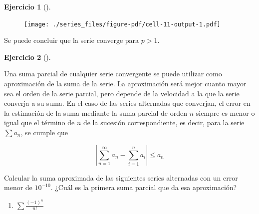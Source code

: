 \documentclass[
  a4paper,
]{scrreport}
\providecommand{\tightlist}{%
  \setlength{\itemsep}{0pt}\setlength{\parskip}{0pt}}\usepackage{longtable,booktabs,array}
\theoremstyle{definition}
\newtheorem{exercise}{Ejercicio}[chapter]
\theoremstyle{remark}
\begin{document}
\begin{exercise}[]
\begin{tcolorbox}
\begin{figure}[H]

{\centering \texttt{[image: ./series\_files/figure-pdf/cell-11-output-1.pdf]}

}

\end{figure}

Se puede concluir que la serie converge para \(p>1\).

\end{tcolorbox}

\end{exercise}

\leavevmode{}%
\begin{exercise}[]\label{exr-serie-alternada}

Una suma parcial de cualquier serie convergente se puede utilizar como
aproximación de la suma de la serie. La aproximación será mejor cuanto
mayor sea el orden de la serie parcial, pero depende de la velocidad a
la que la serie converja a su suma. En el caso de las series alternadas
que converjan, el error en la estimación de la suma mediante la suma
parcial de orden \(n\) siempre es menor o igual que el término de \(n\)
de la sucesión correspondiente, es decir, para la serie \(\sum a_n\), se
cumple que

\[
|\sum_{n=1}^\infty a_n - \sum_{i=1}^n a_i|\leq a_n
\]

Calcular la suma aproximada de las siguientes series alternadas con un
error menor de \(10^{-10}\). ¿Cuál es la primera suma parcial que da esa
aproximación?

\begin{enumerate}
\def\labelenumi{\alph{enumi}.}
\tightlist
\item
  \(\sum \frac{(-1)^n}{n!}\)
\end{enumerate}

\begin{tcolorbox}[enhanced jigsaw, colframe=quarto-callout-tip-color-frame, breakable, colback=white, coltitle=black, left=2mm, toptitle=1mm, colbacktitle=quarto-callout-tip-color!10!white, bottomtitle=1mm, opacityback=0, opacitybacktitle=0.6, title=\textcolor{quarto-callout-tip-color}{\faLightbulb}\hspace{0.5em}{Solución}, titlerule=0mm, toprule=.15mm, arc=.35mm, leftrule=.75mm, rightrule=.15mm, bottomrule=.15mm]


\end{tcolorbox}
\end{exercise}
\end{document}
